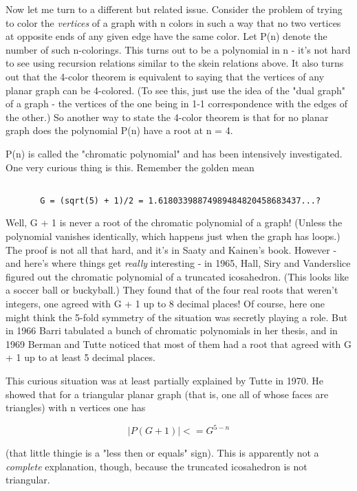 Now let me turn to a different but related issue.  Consider the problem
of trying to color the \emph{vertices} of a graph with n colors in such a way
that no two vertices at opposite ends of any given edge have the same
color.  Let P(n) denote the number of such n-colorings.  This turns out
to be a polynomial in n - it's not hard to see using recursion relations
similar to the skein relations above.  It also turns out that the
4-color theorem is equivalent to saying that the vertices of any planar
graph can be 4-colored.  (To see this, just use the idea of the "dual
graph" of a graph - the vertices of the one being in 1-1 correspondence with
the edges of the other.)  So another way to state the 4-color theorem is
that for no planar graph does the polynomial P(n) have a root at n = 4.

P(n) is called the "chromatic polynomial" and has been intensively
investigated.  One very curious thing is this.  Remember the golden mean


\begin{verbatim}

       G = (sqrt(5) + 1)/2 = 1.61803398874989484820458683437...?
\end{verbatim}
    

Well, G + 1 is never a root of the chromatic polynomial of a graph!
(Unless the polynomial vanishes identically, which happens just when the
graph has loops.)  The proof is not all that hard, and it's in Saaty and
Kainen's book.   However - and here's where things get \emph{really}
interesting - in 1965, Hall, Siry and Vanderslice figured out the
chromatic polynomial of a truncated icosahedron.  (This looks like a
soccer ball or buckyball.) They found that of the four real roots that
weren't integers, one agreed with G + 1 up to 8 decimal places!  Of
course, here one might think the 5-fold symmetry of the situation was
secretly playing a role.  But in 1966 Barri tabulated a bunch of
chromatic polynomials in her thesis, and in 1969 Berman and Tutte
noticed that most of them had a root that agreed with G + 1 up to at
least 5 decimal places.  

This curious situation was at least partially explained by Tutte in
1970.  He showed that for a triangular planar graph (that is, one all
of whose faces are triangles) with n vertices one has


$$

                     |P(G + 1)| <= G^{5-n} 
$$
    

(that little thingie is a "less then or equals" sign).  This is
apparently not a \emph{complete} explanation, though, because the truncated
icosahedron is not triangular.  

